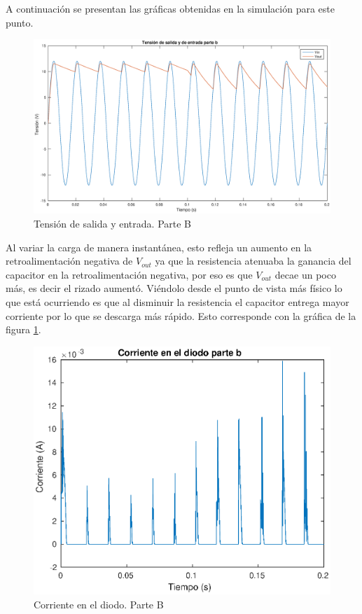 \documentclass[12pt,letterpaper]{article}
\begin{document}
A continuación se presentan las gráficas obtenidas en la simulación para este punto.

\begin{figure}[ht!]
  \centering
  \includegraphics[width=1.0\linewidth]{pictures/Ejercicio2_b_Vin_Vout.eps}
  \caption{Tensión de salida y entrada. Parte B}
  \label{fig:2_b_Vin_Vout}
\end{figure}

Al variar la carga de manera instantánea, esto refleja un aumento en la retroalimentación negativa de $V_{out}$ ya que la resistencia atenuaba la ganancia del capacitor en la retroalimentación negativa, por eso es que $V_{out}$ decae un poco más, es decir el rizado aumentó. Viéndolo desde el punto de vista más físico lo que está ocurriendo es que al disminuir la resistencia el capacitor entrega mayor corriente por lo que se descarga más rápido. Esto corresponde con la gráfica de la figura \ref{fig:2_b_Vin_Vout}.

\begin{figure}[ht!]
  \centering
  \includegraphics[width=0.8\linewidth]{pictures/Ejercicio2_b_corriente_diodo.eps}
  \caption{Corriente en el diodo. Parte B}
  \label{fig:2_b_Id}
\end{figure}
\end{document}
